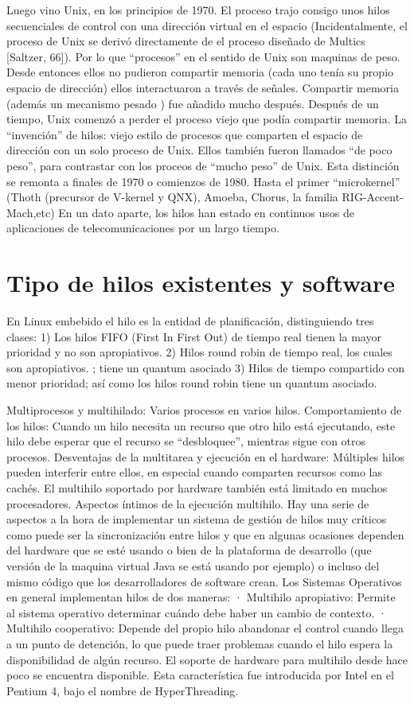\documentclass[11pt]{article}
\begin{document}
Luego vino Unix, en los principios de 1970. El proceso trajo consigo unos hilos secuenciales de control con una dirección virtual en el espacio (Incidentalmente, el proceso de Unix se derivó directamente de el proceso diseñado de Multics [Saltzer, 66]). Por lo que “procesos” en el sentido de Unix son maquinas de peso. Desde entonces ellos no pudieron compartir memoria (cada uno tenía su propio espacio de dirección) ellos interactuaron a través de señales. Compartir memoria (además un mecanismo pesado ) fue añadido mucho después.
Después de un tiempo, Unix comenzó a perder el proceso viejo que podía compartir memoria. La “invención” de hilos: viejo estilo de procesos que comparten el espacio de dirección con un solo proceso de Unix. Ellos también fueron llamados “de poco peso”, para contrastar con los proceos de “mucho peso” de Unix. Esta distinción se remonta a finales de 1970 o comienzos de 1980.  Hasta el primer “microkernel” (Thoth (precursor de V-kernel y QNX), Amoeba, Chorus, la familia RIG-Accent-Mach,etc)
En un dato aparte, los hilos han estado en continuos usos de aplicaciones de telecomunicaciones por un largo tiempo.

\section{Tipo de hilos existentes y software}

En Linux embebido el hilo es la entidad de planificación, distinguiendo tres clases: 
1) Los hilos FIFO (First In First Out) de tiempo real tienen la mayor prioridad y no son apropiativos. 2) Hilos round robin de tiempo real, los cuales son apropiativos. ; tiene un quantum asociado
3) Hilos de tiempo compartido con menor prioridad; así como los hilos round robin tiene un quantum asociado.

Multiprocesos y multihilado: Varios procesos en varios hilos.
Comportamiento de los hilos:
Cuando un hilo necesita un recurso que otro hilo está ejecutando, este hilo debe esperar que el recurso se “desbloquee”, mientras sigue con otros procesos.
Desventajas de la multitarea y ejecución en el hardware:
Múltiples hilos pueden interferir entre ellos, en especial cuando comparten recursos como las cachés. El multihilo soportado por hardware también está limitado en muchos procesadores.
Aspectos íntimos de la ejecución multihilo. 
Hay una serie de aspectos a la hora de implementar un sistema de gestión de hilos muy críticos como puede ser la sincronización entre hilos y que en algunas ocasiones dependen del hardware que se esté usando o bien de la plataforma de desarrollo (que versión de la maquina virtual Java se está usando por ejemplo) o incluso del mismo código que los desarrolladores de software crean.
Los Sistemas Operativos en general implementan hilos de dos maneras: 
· Multihilo apropiativo: Permite al sistema operativo determinar cuándo debe haber un cambio de contexto.
· Multihilo cooperativo: Depende del propio hilo abandonar el control cuando llega a un punto de detención, lo que puede traer problemas cuando el hilo espera la disponibilidad de algún recurso. 
El soporte de hardware para multihilo desde hace poco se encuentra disponible. Esta característica fue introducida por Intel en el Pentium 4, bajo el nombre de HyperThreading.
\end{document}
